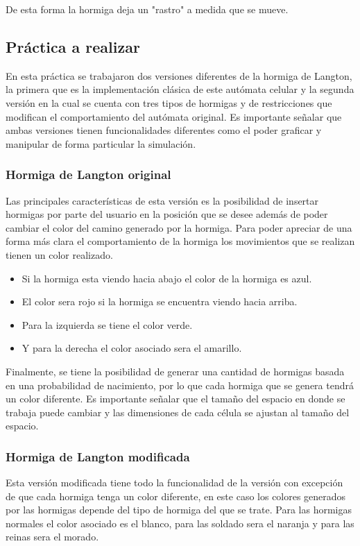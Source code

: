 De esta forma la hormiga deja un "rastro" a medida que se mueve.

\subsection{Práctica a realizar}
En esta práctica se trabajaron dos versiones diferentes de la hormiga de Langton, la primera que es la implementación clásica de este autómata celular y la segunda versión en la cual se cuenta con tres tipos de hormigas y de restricciones que modifican el comportamiento del autómata original. Es importante señalar que ambas versiones tienen funcionalidades diferentes como el poder graficar y manipular de forma particular la simulación.
\subsubsection{Hormiga de Langton original}
Las principales características de esta versión es la posibilidad de insertar hormigas por parte del usuario en la posición que se desee además de poder cambiar el color del camino generado por la hormiga. Para poder apreciar de una forma más clara el comportamiento de la hormiga los movimientos que se realizan tienen un color realizado.

\begin{itemize}
 \item Si la hormiga esta viendo hacia abajo el color de la hormiga es azul.
 \item El color sera rojo si la hormiga se encuentra viendo hacia arriba.
 \item Para la izquierda se tiene el color verde.
 \item Y para la derecha el color asociado sera el amarillo.
\end{itemize}

Finalmente, se tiene la posibilidad de generar una cantidad de hormigas basada en una probabilidad de nacimiento, por lo que cada hormiga que se genera tendrá un color diferente. Es importante señalar que el tamaño del espacio en donde se trabaja puede cambiar y las dimensiones de cada célula se ajustan al tamaño del espacio.

\subsubsection{Hormiga de Langton modificada}
Esta versión modificada tiene todo la funcionalidad de la versión con excepción de que cada hormiga tenga un color diferente, en este caso los colores generados por las hormigas depende del tipo de hormiga del que se trate. Para las hormigas normales el color asociado es el blanco, para las soldado sera el naranja y para las reinas sera el morado.


